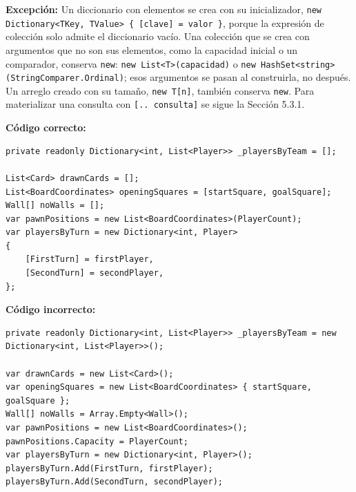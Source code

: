 \textbf{Excepción:} Un diccionario con elementos se crea con su inicializador, \texttt{new Dictionary<TKey, TValue> \{ [clave] = valor \}}, porque la expresión de colección solo admite el diccionario vacío. Una colección que se crea con argumentos que no son sus elementos, como la capacidad inicial o un comparador, conserva \texttt{new}: \texttt{new List<T>(capacidad)} o \texttt{new HashSet<string>(StringComparer.\allowbreak Ordinal)}; esos argumentos se pasan al construirla, no después. Un arreglo creado con su tamaño, \texttt{new T[n]}, también conserva \texttt{new}. Para materializar una consulta con \texttt{[.. consulta]} se sigue la Sección 5.3.1.

\textbf{Código correcto:}
\begin{lstlisting}[style=csharpstyle,basicstyle=\ttfamily\scriptsize]
private readonly Dictionary<int, List<Player>> _playersByTeam = [];

List<Card> drawnCards = [];
List<BoardCoordinates> openingSquares = [startSquare, goalSquare];
Wall[] noWalls = [];
var pawnPositions = new List<BoardCoordinates>(PlayerCount);
var playersByTurn = new Dictionary<int, Player>
{
    [FirstTurn] = firstPlayer,
    [SecondTurn] = secondPlayer,
};
\end{lstlisting}

\textbf{Código incorrecto:}
\begin{lstlisting}[style=csharpstyle,basicstyle=\ttfamily\scriptsize]
private readonly Dictionary<int, List<Player>> _playersByTeam = new Dictionary<int, List<Player>>();

var drawnCards = new List<Card>();
var openingSquares = new List<BoardCoordinates> { startSquare, goalSquare };
Wall[] noWalls = Array.Empty<Wall>();
var pawnPositions = new List<BoardCoordinates>();
pawnPositions.Capacity = PlayerCount;
var playersByTurn = new Dictionary<int, Player>();
playersByTurn.Add(FirstTurn, firstPlayer);
playersByTurn.Add(SecondTurn, secondPlayer);
\end{lstlisting}
